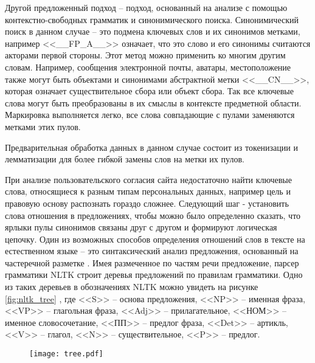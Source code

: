 \documentclass[../main]{subfiles}
\begin{document}
Другой предложенный подход -- подход, основанный на анализе с помощью контекстно-свободных грамматик и синонимического поиска. Синонимический поиск в данном случае -- это подмена ключевых слов и их синонимов метками, например <<\_\_FP\_A\_\_>> означает, что это слово и его синонимы считаются акторами первой стороны. Этот метод можно применить ко многим другим словам. Например, сообщения электронной почты, аватары, местоположение также могут быть объектами и синонимами абстрактной метки <<\_\_CN\_\_>>, которая означает существительное сбора или объект сбора. Так все ключевые слова могут быть преобразованы в их смыслы в контексте предметной области. Маркировка выполняется легко, все слова совпадающие с пулами заменяются метками этих пулов.

Предварительная обработка данных в данном случае состоит из токенизации и лемматизации для более гибкой замены слов на метки их пулов.

При анализе пользовательского согласия сайта недостаточно найти ключевые слова, относящиеся к разным типам персональных данных, например цель и правовую основу распознать гораздо сложнее. Следующий шаг - установить слова отношения в предложениях, чтобы можно было определенно сказать, что ярлыки пулы синонимов связаны друг с другом и формируют логическая цепочку. Один из возможных способов определения отношений слов в тексте на естественном языке -- это синтаксический анализ предложения, основанный на частеречной разметке \cite{POS}. Имея размеченное по частям речи предложение, парсер грамматики NLTK \cite{NLTK} строит деревья предложений по правилам грамматики. Одно из таких деревьев в обозначениях NLTK можно увидеть на рисунке \ref{fig:nltk_tree} \cite{NLTK}, где <<S>> -- основа предложения, <<NP>> -- именная фраза, <<VP>> -- глагольная фраза, <<Adj>> -- прилагательное, <<НОМ>> -- именное словосочетание, <<ПП>> -- предлог фраза, <<Det>> -- артикль, <<V>> -- глагол, <<N>> -- существительное, <<P>> -- предлог.

\begin{figure}[H]
    \centering
    {\texttt{[image: tree.pdf]}}
    \vspace{-\baselineskip}
\end{figure}
\end{document}
